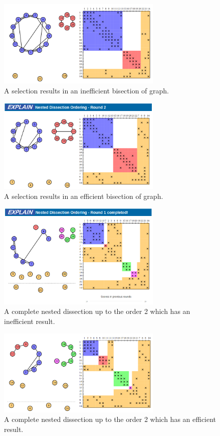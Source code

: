 \documentclass[12pt, oneside]{book}
\begin{document}
\begin{figure}
\centering
\includegraphics[width=0.7\textwidth]{bad_bisection}
\caption{A selection results in an inefficient bisection of graph.}
\label{bad_bisection}
\end{figure}

\begin{figure}
\centering
\includegraphics[width=0.7\textwidth]{good_bisection}
\caption{A selection results in an efficient bisection of graph.}
\label{good_bisection}
\end{figure}

\begin{figure}
\centering
\includegraphics[width=0.7\textwidth]{bad_disection}
\caption{A complete nested dissection up to the order 2 which has an 
inefficient result.}
\label{bad_disection}
\end{figure}


\begin{figure}
\centering
\includegraphics[width=0.7\textwidth]{good_disection}
\caption{A complete nested dissection up to the order 2 which has an 
efficient result.}
\label{good_disection}
\end{figure}
\end{document}
